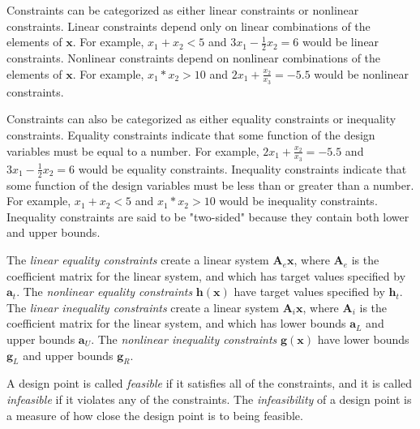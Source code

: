 Constraints can be categorized as either linear constraints or nonlinear constraints.
Linear constraints depend only on linear combinations of the elements of $\textbf{x}$.
For example, $x_1 + x_2 < 5$ and $3x_1 - \frac{1}{2}x_2 = 6$ would be linear constraints.
Nonlinear constraints depend on nonlinear combinations of the elements of $\textbf{x}$.
For example, $x_1 * x_2 > 10$ and $2x_1 + \frac{x_2}{x_3} = -5.5$ would be nonlinear constraints.

Constraints can also be categorized as either equality constraints or inequality constraints.
Equality constraints indicate that some function of the design variables must be equal to a number.
For example, $2x_1 + \frac{x_2}{x_3} = -5.5$ and $3x_1 - \frac{1}{2}x_2 = 6$ would be equality constraints.
Inequality constraints indicate that some function of the design variables must be less than or greater than a number.
For example, $x_1 + x_2 < 5$ and $x_1 * x_2 > 10$ would be inequality constraints.
Inequality constraints are said to be "two-sided" because they contain both lower and upper bounds.

The \textit{linear equality constraints} create a linear system $\textbf{A}_e\textbf{x}$, where ${\textbf{A}_e}$ is the coefficient matrix for the linear system, and which has target values specified by ${\textbf{a}_t}$.
The \textit{nonlinear equality constraints} ${\textbf{h}\left(\textbf{x}\right)}$ have target values specified by $\textbf{h}_t$.
The \textit{linear inequality constraints} create a linear system $\textbf{A}_i\textbf{x}$, where ${\textbf{A}_i}$ is the coefficient matrix for the linear system, and which has lower bounds $\textbf{a}_L$ and upper bounds $\textbf{a}_U$.
The \textit{nonlinear inequality constraints} $\textbf{g}\left(\textbf{x}\right)$ have lower bounds $\textbf{g}_L$ and upper bounds $\textbf{g}_R$.

A design point is called \textit{feasible} if it satisfies all of the constraints, and it is called \textit{infeasible} if it violates any of the constraints.
The \textit{infeasibility} of a design point is a measure of how close the design point is to being feasible.
